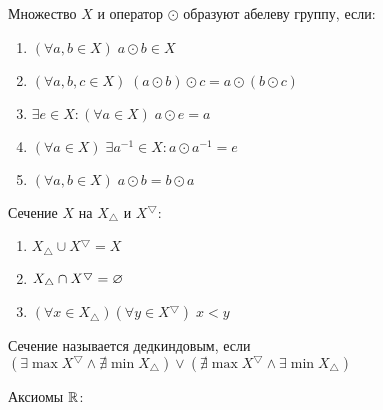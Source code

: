 \documentclass{article}
\begin{document}


Множество $X$ и оператор $\odot$ образуют абелеву группу, если:

\begin{enumerate}[label=\Roman*.]
	\item$(\forall a, b\in X)\;a\odot b\in X$
	\item$(\forall a,b,c\in X)\;(a\odot b)\odot c=a\odot(b\odot c)$
	\item$\exists e\in X:(\forall a\in X)\;a\odot e=a$
	\item$(\forall a\in X)\;\exists a^{-1}\in X:a\odot a^{-1}=e$
	\item$(\forall a, b\in X)\;a\odot b=b\odot a$
\end{enumerate}


\newcommand{\Xbottom}{X_\triangle}
\newcommand{\Xtop}{X^\bigtriangledown}
Сечение $X$ на $\Xbottom$ и $\Xtop$:

\begin{enumerate}[label=\Roman*.]
	\item$\Xbottom\cup \Xtop=X$
	\item$\Xbottom\cap \Xtop=\eset$
	\item$(\forall x\in \Xbottom)(\forall y\in \Xtop)\;x<y$
\end{enumerate}

Сечение называется дедкиндовым, если $(\exists\max\Xtop\land\nexists\min\Xbottom)\lor(\nexists\max\Xtop\land\exists\min\Xbottom)$


Аксиомы $\mathbb{R}$:
\end{document}

